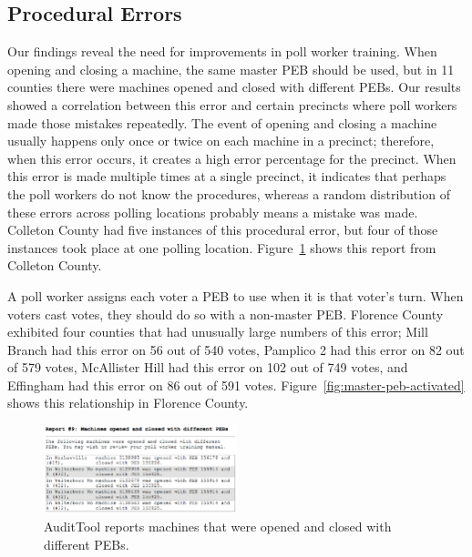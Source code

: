 \documentclass[letterpaper,twocolumn,10pt]{article}
\begin{document}
\subsection{Procedural Errors}
Our findings reveal the need for improvements in poll worker training. When
opening and closing a machine, the same master PEB should be used, but in 11
counties there were machines opened and closed with different PEBs. Our results
showed a correlation between this error and certain precincts where poll workers
made those mistakes repeatedly. The event of opening and closing a machine 
usually happens only once or twice on each machine in a precinct; therefore, 
when this error occurs, it creates a high error percentage for the precinct. 
When this error is made multiple times at a single precinct, it indicates 
that perhaps the poll workers do
not know the procedures, whereas a random distribution of these errors across
polling locations probably means a mistake was made. Colleton County had five
instances of this procedural error, but four of those instances took place at
one polling location. Figure~\ref{fig:diff-pebs-open-close} shows this report
from Colleton County.  

A poll worker assigns each voter a PEB to use when it is that voter's turn. When 
voters cast votes, they should do so with a non-master PEB. Florence County exhibited 
four counties that had unusually large numbers of this error; Mill Branch had 
this error on 56 out of 540 votes, Pamplico 2 had this error on 82 out of 579 
votes, McAllister Hill had this error on 102 out of 749 votes, and Effingham 
had this error on 86 out of 591 votes. Figure~\ref{fig:master-peb-activated} 
shows this relationship in Florence County. 

\begin{figure}[htbp]
\begin{center}
    \includegraphics[width=0.5\textwidth,height=0.2\textheight]{OpenClosePEBs.eps}
\end{center}
\caption{AuditTool reports machines that were opened and closed with different PEBs.}
\label{fig:diff-pebs-open-close}
\end{figure}
\end{document}
